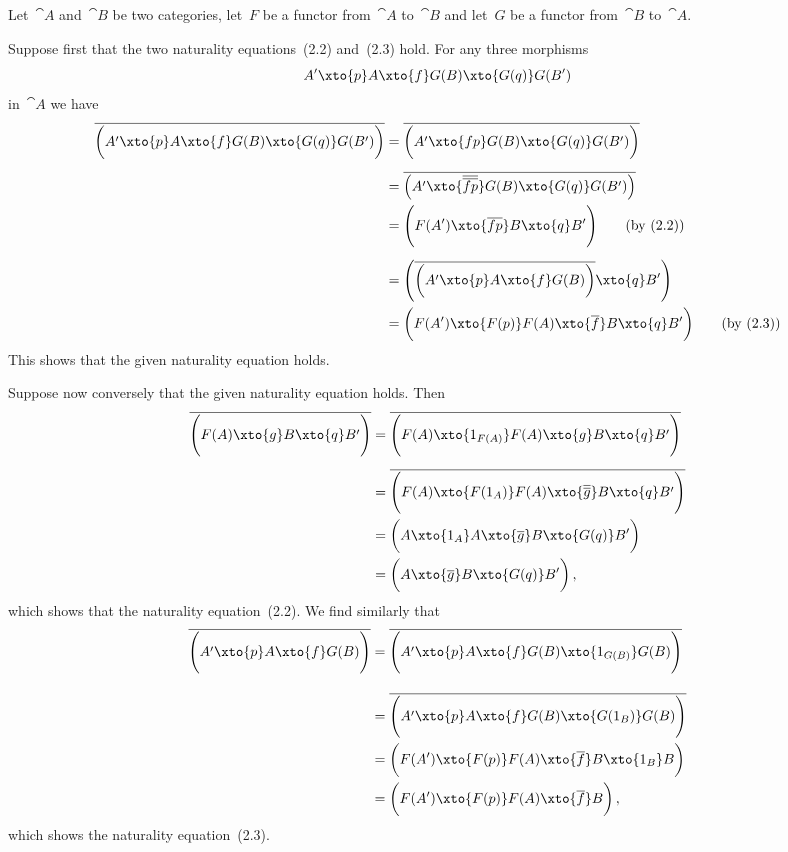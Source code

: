 \subsection{}

Let~$\cat{A}$ and~$\cat{B}$ be two categories, let~$F$ be a functor from~$\cat{A}$ to~$\cat{B}$ and let~$G$ be a functor from~$\cat{B}$ to~$\cat{A}$.

Suppose first that the two naturality equations~(2.2) and~(2.3) hold.
For any three morphisms
\[
	A'
	\xto{p}
	A
	\xto{f}
	G(B)
	\xto{G(q)}
	G(B')
\]
in~$\cat{A}$ we have
\begingroup
\allowdisplaybreaks
\begin{align*}
	\adjtranspose{
		\biggl(
			A'
			\xto{p}
			A
			\xto{f}
			G(B)
			\xto{G(q)}
			G(B')
		\biggr)
	}
	&=
	\adjtranspose{
		\biggl(
			A'
			\xto{f p}
			G(B)
			\xto{G(q)}
			G(B')
		\biggr)
	}
	\\[0.5em]
	&=
	\adjtranspose{
		\left(
			A'
			\xto{\adjtranspose{\adjtranspose{f p}}}
			G(B)
			\xto{G(q)}
			G(B')
		\right)
	}
	\\
	&=
	\Biggl(
		F(A')
		\xto{\adjtranspose{f p}}
		B
		\xto{q}
		B'
	\Biggr)
	\tag{by~(2.2)}
	\\[0.5em]
	&=
	\left(
		\adjtranspose{
			\biggl(
				A'
				\xto{p}
				A
				\xto{f}
				G(B)
			\biggr)
		}
		\xto{q}
		B'
	\right)
	\\
	&=
	\biggl(
		F(A')
		\xto{F(p)}
		F(A)
		\xto{\adjtranspose{f}}
		B
		\xto{q}
		B'
	\biggr)
	\tag{by~(2.3)}
\end{align*}
\endgroup
This shows that the given naturality equation holds.

Suppose now conversely that the given naturality equation holds.
Then
\begin{align*}
	\adjtranspose{
		\Biggl(
			F(A)
			\xto{g}
			B
			\xto{q}
			B'
		\Biggr)
	}
	&=
	\adjtranspose{
		\Biggl(
			F(A)
			\xto{1_{F(A)}}
			F(A)
			\xto{g}
			B
			\xto{q}
			B'
		\Biggr)
	}
	\\[0.5em]
	&=
	\adjtranspose{
		\Biggl(
			F(A)
			\xto{F(1_A)}
			F(A)
			\xto{\adjtranspose{\adjtranspose{g}}}
			B
			\xto{q}
			B'
		\Biggr)
	}
	\\
	&=
	\biggl(
		A
		\xto{1_A}
		A
		\xto{\adjtranspose{g}}
		B
		\xto{G(q)}
		B'
	\biggr)
	\\
	&=
	\biggl(
		A
		\xto{\adjtranspose{g}}
		B
		\xto{G(q)}
		B'
	\biggr) \,,
\end{align*}
which shows that the naturality equation~(2.2).
We find similarly that
\begingroup
\allowdisplaybreaks
\begin{align*}
	\adjtranspose{
		\Biggl(
			A'
			\xto{p}
			A
			\xto{f}
			G(B)
		\Biggr)
	}
	&=
	\adjtranspose{
		\Biggl(
			A'
			\xto{p}
			A
			\xto{f}
			G(B)
			\xto{1_{G(B)}}
			G(B)
		\Biggr)
	}
	\\[1em]
	&=
	\adjtranspose{
		\Biggl(
			A'
			\xto{p}
			A
			\xto{f}
			G(B)
			\xto{G(1_B)}
			G(B)
		\Biggr)
	}
	\\
	&=
	\biggl(
		F(A')
		\xto{F(p)}
		F(A)
		\xto{\adjtranspose{f}}
		B
		\xto{1_B}
		B
	\biggr)
	\\
	&=
	\biggl(
		F(A')
		\xto{F(p)}
		F(A)
		\xto{\adjtranspose{f}}
		B
	\biggr) \,,
\end{align*}
\endgroup
which shows the naturality equation~(2.3).
